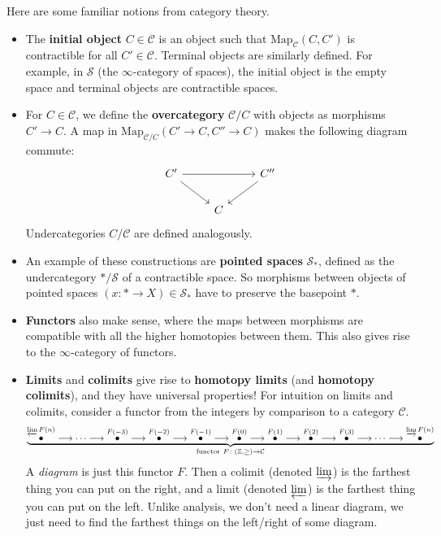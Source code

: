 \begin{example}
    Here are some familiar notions from category theory.
    \begin{itemize}
\setlength\itemsep{-.2em}
        \item The \textbf{initial object} $C \in \mathcal{C} $ is an object such that $\mathrm{Map}_{\mathcal{C} } (C,C')$ is contractible for all $C' \in \mathcal{C} $. Terminal objects are similarly defined. For example, in $\mathcal{S} $ (the $\infty$-category of spaces), the initial object is the empty space and terminal objects are contractible spaces.
        \item For $C \in \mathcal{C} $, we define the \textbf{overcategory} $\mathcal{C} /C$ with objects as morphisms $C' \to C$. A map in $\mathrm{Map}_{\mathcal{C} /C}(C' \to C, C''\to C)$ makes the following diagram commute: \[
        \begin{tikzcd}
            C' \arrow[rr]\arrow[rd]& & C''\arrow[ld] \\
               & C &
        \end{tikzcd}
        \] Undercategories $C / \mathcal{C} $ are defined analogously.
    \item An example of these constructions are \textbf{pointed spaces} $\mathcal{S} _*$, defined as the undercategory $* / \mathcal{S} $ of a contractible space. So morphisms between objects of pointed spaces $(x \colon * \to X) \in \mathcal{S} _*$ have to preserve the basepoint $*$.
    \item \textbf{Functors} also make sense, where the maps between morphisms are compatible with all the higher homotopies between them. This also gives rise to the $\infty$-category of functors.
    \item \textbf{Limits} and \textbf{colimits} give rise to \textbf{homotopy limits} (and \textbf{homotopy colimits}), and they have universal properties! For intuition on limits and colimits, consider a functor from the integers by comparison to a category $\mathcal{C} $. \[
            \underset{\text{functor} \ F \colon (\mathbb{Z},\geq ) \to \mathcal{C} }{\underbrace{  \overset{\varprojlim F(n)}{\bullet} \longrightarrow \cdots \longrightarrow\overset{F(-3)}{\bullet } \longrightarrow \overset{F(-2)}{\bullet} \longrightarrow \overset{F(-1)}{\bullet} \longrightarrow \overset{F(0)}{\bullet} \longrightarrow \overset{F(1)}{\bullet } \longrightarrow \overset{F(2)}{\bullet} \longrightarrow \overset{F(3)}{\bullet} \longrightarrow \cdots \longrightarrow \overset{\varinjlim F(n)}{\bullet} }} 
        \] A \emph{diagram} is just this functor $F$. Then a colimit (denoted $\varinjlim$) is the farthest thing you can put on the right, and a limit (denoted $\varprojlim$) is the farthest thing you can put on the left. Unlike analysis, we don't need a linear diagram, we just need to find the farthest things on the left/right of some diagram.

\end{itemize}
\end{example}

